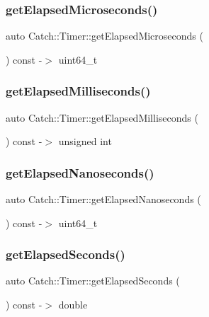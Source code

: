 \subsubsection{\texorpdfstring{getElapsedMicroseconds()}{getElapsedMicroseconds()}}
{\footnotesize\ttfamily auto Catch\+::\+Timer\+::get\+Elapsed\+Microseconds (\begin{DoxyParamCaption}{ }\end{DoxyParamCaption}) const -\/$>$  uint64\+\_\+t}

\mbox{\label{class_catch_1_1_timer_a30aaf458dbb59dd8ac8971c9c62e0eac}} 
\subsubsection{\texorpdfstring{getElapsedMilliseconds()}{getElapsedMilliseconds()}}
{\footnotesize\ttfamily auto Catch\+::\+Timer\+::get\+Elapsed\+Milliseconds (\begin{DoxyParamCaption}{ }\end{DoxyParamCaption}) const -\/$>$  unsigned int}

\mbox{\label{class_catch_1_1_timer_a57be5d17ca868a2d6fb1eea84de665cf}} 
\subsubsection{\texorpdfstring{getElapsedNanoseconds()}{getElapsedNanoseconds()}}
{\footnotesize\ttfamily auto Catch\+::\+Timer\+::get\+Elapsed\+Nanoseconds (\begin{DoxyParamCaption}{ }\end{DoxyParamCaption}) const -\/$>$  uint64\+\_\+t}

\mbox{\label{class_catch_1_1_timer_a065e37e3c9eb16bd4dcf41971d8deedc}} 
\subsubsection{\texorpdfstring{getElapsedSeconds()}{getElapsedSeconds()}}
{\footnotesize\ttfamily auto Catch\+::\+Timer\+::get\+Elapsed\+Seconds (\begin{DoxyParamCaption}{ }\end{DoxyParamCaption}) const -\/$>$  double}

